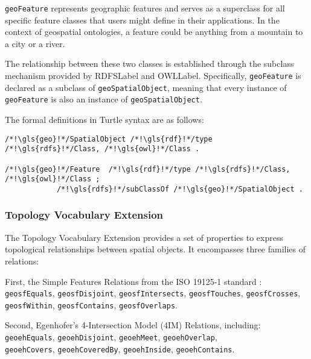 \texttt{\gls{geo}Feature} represents geographic features and serves as a superclass for all specific feature classes that users might define in their applications. In the context of geospatial ontologies, a feature could be anything from a mountain to a city or a river.

The relationship between these two classes is established through the subclass mechanism provided by \acrshort{RDFSLabel} and \acrshort{OWLLabel}. Specifically, \texttt{\gls{geo}Feature} is declared as a subclass of \texttt{\gls{geo}SpatialObject}, meaning that every instance of \texttt{\gls{geo}Feature} is also an instance of \texttt{\gls{geo}SpatialObject}.

The formal definitions in Turtle syntax are as follows:

\begin{lstlisting}[caption=Definition of classes \texttt{geo:SpatialObject} and \texttt{geo:Feature} , label={lst:definition-geosparql1}]
/*!\gls{geo}!*/SpatialObject /*!\gls{rdf}!*/type /*!\gls{rdfs}!*/Class, /*!\gls{owl}!*/Class .

/*!\gls{geo}!*/Feature  /*!\gls{rdf}!*/type /*!\gls{rdfs}!*/Class, /*!\gls{owl}!*/Class ;
            /*!\gls{rdfs}!*/subClassOf /*!\gls{geo}!*/SpatialObject .
\end{lstlisting}

\subsubsection{Topology Vocabulary Extension}\label{III-subsubsec:geosparqlTopology}

The Topology Vocabulary Extension provides a set of properties to express topological relationships between spatial objects. It encompasses three families of relations:

First, the Simple Features Relations from the ISO 19125-1 standard \cite{ISO19125120042004}:\\
 \texttt{\gls{geo}sfEquals}, \texttt{\gls{geo}sfDisjoint}, \texttt{\gls{geo}sfIntersects}, \texttt{\gls{geo}sfTouches}, \texttt{\gls{geo}sfCrosses}, \texttt{\gls{geo}sfWithin}, \texttt{\gls{geo}sfContains}, \texttt{\gls{geo}sfOverlaps}.

Second, Egenhofer’s 4-Intersection Model (4IM) Relations, including:\\
\texttt{\gls{geo}ehEquals}, \texttt{\gls{geo}ehDisjoint}, \texttt{\gls{geo}ehMeet}, \texttt{\gls{geo}ehOverlap},\\
\texttt{\gls{geo}ehCovers}, \texttt{\gls{geo}ehCoveredBy}, \texttt{\gls{geo}ehInside}, \texttt{\gls{geo}ehContains}.


